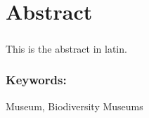 
\chapter*{Abstract}

\paragraph*{}
This is the abstract in latin.

\subsection*{Keywords:}
Museum, Biodiversity Museums